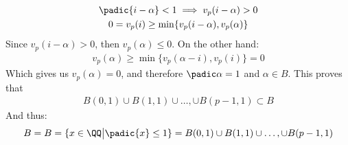 \begin{enumerate}[label=\ilabel]
        \begin{gather*}
            \padic{i - \alpha} < 1 \implies v_p(i - \alpha) > 0  \\
            0 = v_p(i) \ge \min \{v_p(i - \alpha), v_p(\alpha) \}
        \end{gather*}
        Since $v_p(i - \alpha) > 0$, then $v_p(\alpha) \le 0$. On the other hand:
        \begin{gather*}
            v_p(\alpha) \ge \min \{v_p(\alpha - i) , v_p(i) \} = 0
        \end{gather*}
        Which gives us $v_p(\alpha) = 0$, and therefore $\padic \alpha = 1$ and $\alpha \in B$. This proves that 
        \begin{gather*}
            B(0, 1) \cup B(1, 1) \cup \dots, \cup B(p - 1, 1) \subset B
        \end{gather*}
        And thus:
        \begin{gather*}
            B =  B = \{x \in \QQ \big| \padic{x} \le 1 \} = B(0, 1) \cup B(1, 1) \cup \dots, \cup B(p - 1, 1) 
        \end{gather*}
\end{enumerate}